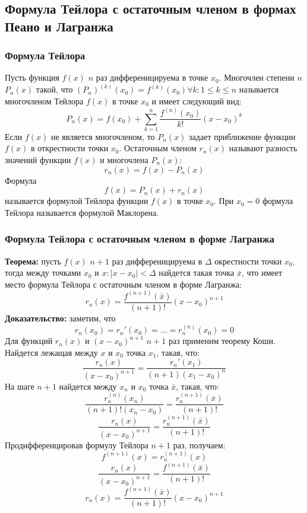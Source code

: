 \documentclass{article}
\newcommand{\theorem}{\textbf{Теорема:} }
\newcommand{\proof}{\textbf{Доказательство:} }
\begin{document}
    \subsection*{Формула Тейлора с остаточным членом в формах Пеано и Лагранжа}
        \subsubsection*{Формула Тейлора}
        Пусть функция $f(x)$ $n$ раз дифференицируема в точке $x_0$. Многочлен степени $n$ $P_n(x)$ такой, что $(P_n)^{(k)}(x_0) = f^{(k)}(x_0) \forall k: 1 \le k \le n$
        называется многочленом Тейлора $f(x)$ в точке $x_0$ и имеет следующий вид:
        \[ P_n(x) = f(x_0) + \sum_{k=1}^{n} \frac{f^{(n)}(x_0)}{k!} (x - x_0)^k \]
        Если $f(x)$ не является многочленом, то $P_n(x)$ задает приближение функции $f(x)$ в открестности точки $x_0$.
        Остаточным членом $r_n(x)$ называют разность значений функции $f(x)$ и многочлена $P_n(x)$:
        \[ r_n(x) = f(x) - P_n(x) \]
        Формула
        \[ f(x) = P_n(x) + r_n(x) \]
        называется формулой Тейлора функции $f(x)$ в точке $x_0$.
        При $x_0 = 0$ формула Тейлора называется формулой Маклорена.
        
        \subsubsection*{Формула Тейлора с остаточным членом в форме Лагранжа}
        \theorem пусть $f(x)$ $n + 1$ раз дифференицируема в $\Delta$ окрестности точки $x_0$, тогда между точками $x_0$ и $x: |x - x_0| < \Delta$ найдется такая точка $\bar x$,
        что имеет место формула Тейлора с остаточным членом в форме Лагранжа:
        \[ r_n(x) = \frac{f^{(n+1)}(\bar x)}{(n + 1)!}(x - x_0)^{n + 1} \]
        \proof
        заметим, что 
        \[ r_n(x_0) = r_n'(x_0) = ... = r_n^{(n)}(x_0) = 0 \]
        Для функций $r_n(x)$ и $(x - x_0)^{n + 1}$ $n + 1$ раз применим теорему Коши.
        Найдется лежащая между $x$ и $x_0$ точка $x_1$, такая, что:
        \[ \frac{r_n(x)}{(x - x_0)^{n + 1}} = \frac{r_n'(x_1)}{(n + 1)(x_1 - x_0)^{n}} \]
        На шаге $n + 1$ найдется между $x_n$ и $x_0$ точка $\bar x$, такая, что:
        \[ \frac{r_n^{(n)}(x_n)}{(n + 1)!(x_n - x_0)} = \frac{r_n^{(n + 1)}(\bar x)}{(n + 1)!} \]
        \[ \frac{r_n(x)}{(x - x_0)^{n + 1}} = \frac{r_n^{(n + 1)}(\bar x)}{(n + 1)!} \]
        Продифференцировав формулу Тейлора $n + 1$ раз, получаем:
        \[ f^{(n + 1)}(x) = r_n^{(n + 1)}(x) \]
        \[ \frac{r_n(x)}{(x - x_0)^{n + 1}} = \frac{f^{(n + 1)}(\bar x)}{(n + 1)!} \]
        \[  r_n(x) = \frac{f^{(n + 1)}(\bar x)}{(n + 1)!} (x - x_0)^{n + 1} \]
\end{document}
